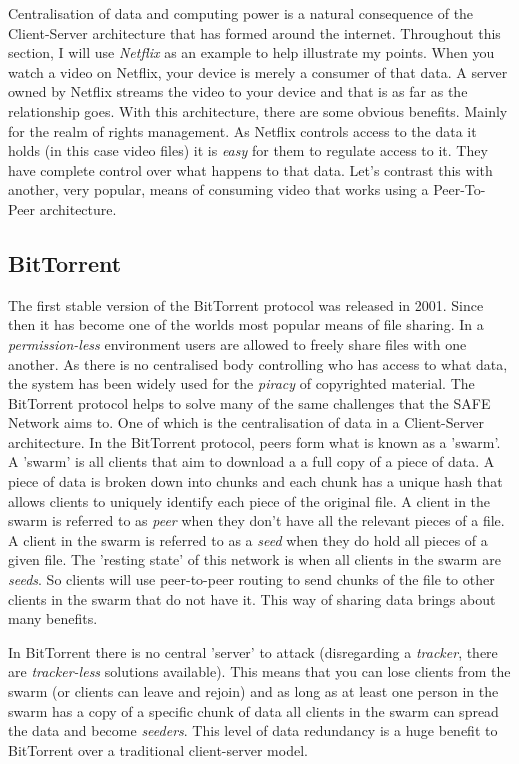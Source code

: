 \documentclass{l4proj}
\begin{document}
Centralisation of data and computing power is a natural consequence of the Client-Server architecture that has formed around the internet. Throughout this section, I will use \textit{Netflix} as an example to help illustrate my points. When you watch a video on Netflix, your device is merely a consumer of that data. A server owned by Netflix streams the video to your device and that is as far as the relationship goes. With this architecture, there are some obvious benefits. Mainly for the realm of rights management. As Netflix controls access to the data it holds (in this case video files) it is \textit{easy} for them to regulate access to it. They have complete control over what happens to that data. Let's contrast this with another, very popular, means of consuming video that works using a Peer-To-Peer architecture.

\subsection{BitTorrent}

The first stable version of the BitTorrent protocol was released in 2001. Since then it has become one of the worlds most popular means of file sharing. In a \textit{permission-less} environment users are allowed to freely share files with one another. As there is no centralised body controlling who has access to what data, the system has been widely used for the \textit{piracy} of copyrighted material. The BitTorrent protocol helps to solve many of the same challenges that the SAFE Network aims to. One of which is the centralisation of data in a Client-Server architecture. In the BitTorrent protocol, peers form what is known as a 'swarm'. A 'swarm' is all clients that aim to download a a full copy of a piece of data. A piece of data is broken down into chunks and each chunk has a unique hash that allows clients to uniquely identify each piece of the original file. A client in the swarm is referred to as \textit{peer} when they don't have all the relevant pieces of a file. A client in the swarm is referred to as a \textit{seed} when they do hold all pieces of a given file. The 'resting state' of this network is when all clients in the swarm are \textit{seeds}. So clients will use peer-to-peer routing to send chunks of the file to other clients in the swarm that do not have it. This way of sharing data brings about many benefits. 

In BitTorrent there is no central 'server' to attack (disregarding a \textit{tracker}, there are \textit{tracker-less} solutions available). This means that you can lose clients from the swarm (or clients can leave and rejoin) and as long as at least one person in the swarm has a copy of a specific chunk of data all clients in the swarm can spread the data and become \textit{seeders}. This level of data redundancy is a huge benefit to BitTorrent over a traditional client-server model.
\end{document}
